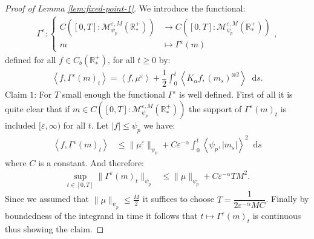 \documentclass[11pt,a4paper]{article}
\newcommand{\RRP}{\mathbb{R}^+_*}
\newcommand{\MC}{\mathcal{M}}
\newcommand{\brac}[1]{\left\langle#1\right\rangle}
\newcommand{\dd}{\mathop{}\!\mathrm{d}}
\begin{document}
\begin{proof}[Proof of Lemma \ref{lem:fixed-point-1}]
    We introduce the functional:
    \begin{align*}
    \Gamma^\varepsilon : 
    \left\lbrace 
    \begin{aligned}
        C\left([0,T]:\MC^{\varepsilon,M}_{\psi_p}(\RRP) \right) &\to C\left([0,T]:\MC^{\varepsilon,M}_{\psi_p}(\RRP) \right)\\
         m & \mapsto \Gamma^\varepsilon(m)
    \end{aligned}
    \right.,
    \end{align*}
    defined for all $f \in C_b(\RRP)$, for all $t \geq 0$ by:
    \begin{align*}
        \brac{f,\Gamma^\varepsilon(m)_t}= \brac{f,\mu^\varepsilon} + \dfrac12\int_0^t \brac{K_\alpha f,\left(m_s\right)^{\otimes 2}} \dd s.
    \end{align*}
    Claim $1$: For $T$ small enough the functional $\Gamma^\varepsilon$ is well defined. First of all it is quite clear that if $m \in C\left([0,T]:\MC^{\varepsilon,M}_{\psi_p}(\RRP) \right)$ the support of $\Gamma^\varepsilon(m)_t$ is included $[\varepsilon,\infty)$ for all $t$. Let $|f| \leq \psi_p$ we have:
    \begin{align*}
        \brac{f,\Gamma^\varepsilon(m)_t} &\leq \|\mu^\varepsilon\|_{\psi_p} + C\varepsilon^{-\alpha}\int_0^t \brac{\psi_p,|m_s|}^2 \dd s 
    \end{align*}
    where $C$ is a constant. And therefore:
    \begin{align*}
        \sup\limits_{t\in [0,T]} \| \Gamma^\varepsilon(m)_t\|_{\psi_p} 
        &\leq \|\mu\|_{\psi_p} + C\varepsilon^{-\alpha} T M^2.
    \end{align*}
    Since we assumed that $\|\mu\|_{\psi_p} \leq \frac{M}{2}$ it suffices to choose $T = \dfrac{1}{2\varepsilon^{-\alpha}MC}$. Finally by boundedness of the integrand in time it follows that $t \mapsto \Gamma^\varepsilon(m)_t$ is continuous thus showing the claim.


\end{proof}
\end{document}
